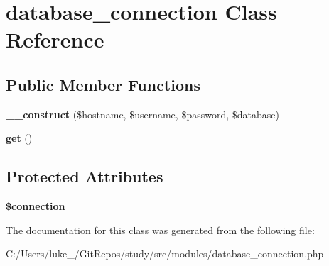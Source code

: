 \hypertarget{classdatabase__connection}{}\section{database\+\_\+connection Class Reference}
\label{classdatabase__connection}
\subsection*{Public Member Functions}
\begin{DoxyCompactItemize}
\item 
\mbox{\label{classdatabase__connection_a424b08ee446e87f3aaaa20c080969f05}} 
{\bfseries \+\_\+\+\_\+construct} (\$hostname, \$username, \$password, \$database)
\item 
\mbox{\label{classdatabase__connection_ac33ee765f5ad9f134540bac393721cfe}} 
{\bfseries get} ()
\end{DoxyCompactItemize}
\subsection*{Protected Attributes}
\begin{DoxyCompactItemize}
\item 
\mbox{\label{classdatabase__connection_a0d9c79b9b86b3f5891c6d3892f12c6a0}} 
{\bfseries \$connection}
\end{DoxyCompactItemize}


The documentation for this class was generated from the following file\+:\begin{DoxyCompactItemize}
\item 
C\+:/\+Users/luke\+\_\+/\+Git\+Repos/study/src/modules/database\+\_\+connection.\+php\end{DoxyCompactItemize}
